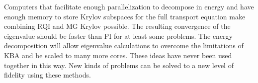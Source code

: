Computers that facilitate enough parallelization to decompose in energy and have enough memory to store Krylov subspaces for the full transport equation make combining RQI and MG Krylov possible. The resulting convergence of the eigenvalue should be faster than PI for at least some problems. The energy decomposition will allow eigenvalue calculations to overcome the limitations of KBA and be scaled to many more cores. These ideas have never been used together in this way. New kinds of problems can be solved to a new level of fidelity using these methods. 

